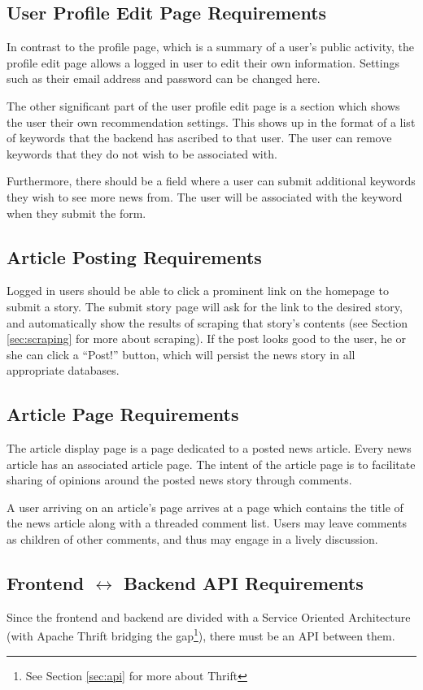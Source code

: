 \documentclass[11pt,letterpaper]{article}
\begin{document}
\subsection{User Profile Edit Page Requirements}
In contrast to the profile page, which is a summary of a user's public activity, the profile edit page allows a logged in user to edit their own information.
Settings such as their email address and password can be changed here.

The other significant part of the user profile edit page is a section which shows the user their own recommendation settings.
This shows up in the format of a list of keywords that the backend has ascribed to that user.
The user can remove keywords that they do not wish to be associated with.

Furthermore, there should be a field where a user can submit additional keywords they wish to see more news from.
The user will be associated with the keyword when they submit the form.

\subsection{Article Posting Requirements}
Logged in users should be able to click a prominent link on the homepage to submit a story.
The submit story page will ask for the link to the desired story, and automatically show the results of scraping that story's contents (see Section \ref{sec:scraping} for more about scraping).
If the post looks good to the user, he or she can click a ``Post!'' button, which will persist the news story in all appropriate databases.

\subsection{Article Page Requirements}
The article display page is a page dedicated to a posted news article. Every news article has an associated article page.
The intent of the article page is to facilitate sharing of opinions around the posted news story through comments.

A user arriving on an article's page arrives at a page which contains the title of the news article along with a threaded comment list.
Users may leave comments as children of other comments, and thus may engage in a lively discussion.

\subsection{Frontend $\leftrightarrow$ Backend API Requirements}
Since the frontend and backend are divided with a Service Oriented Architecture (with Apache Thrift bridging the gap\footnote{See Section \ref{sec:api} for more about Thrift}), there must be an API between them.
\end{document}
